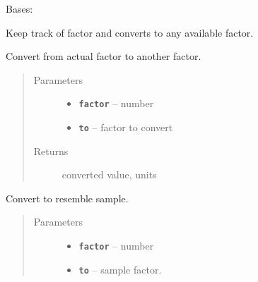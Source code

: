 \documentclass[letterpaper,10pt,english]{sphinxmanual}
\begin{document}
\begin{fulllineitems}
\label{RRtoolbox.lib:RRtoolbox.lib.root.FactorConvert}
Bases: 

Keep track of factor and converts to any available factor.

\begin{fulllineitems}
\label{RRtoolbox.lib:RRtoolbox.lib.root.FactorConvert.convert}
Convert from actual factor to another factor.
\begin{quote}\begin{description}
\item[{Parameters}] \leavevmode\begin{itemize}
\item {} 
\textbf{\texttt{factor}} -- number

\item {} 
\textbf{\texttt{to}} -- factor to convert

\end{itemize}

\item[{Returns}] \leavevmode
converted value, units

\end{description}\end{quote}

\end{fulllineitems}


\begin{fulllineitems}
\label{RRtoolbox.lib:RRtoolbox.lib.root.FactorConvert.convert2sample}
Convert to resemble sample.
\begin{quote}\begin{description}
\item[{Parameters}] \leavevmode\begin{itemize}
\item {} 
\textbf{\texttt{factor}} -- number

\item {} 
\textbf{\texttt{to}} -- sample factor.

\end{itemize}


\end{description}
\end{quote}
\end{fulllineitems}
\end{fulllineitems}
\end{document}
